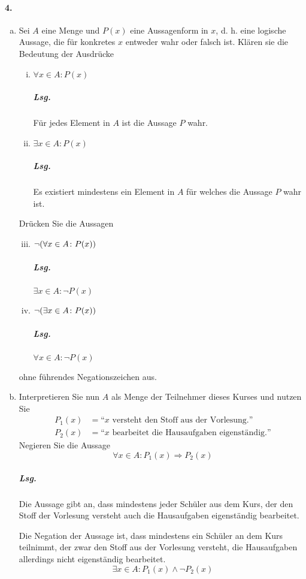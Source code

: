 \documentclass{scrreprt}
\begin{document}
\paragraph{4.}
\begin{enumerate}[a)]
\item Sei $A$ eine Menge und $P(x)$ eine Aussagenform in $x$, d. h. eine
  logische Aussage, die für konkretes $x$ entweder wahr oder falsch ist.
  Klären sie die Bedeutung der Ausdrücke
  \begin{enumerate}[(i)]
  \item $\forall x \in A \colon P(x)$

    \subparagraph{Lsg.} Für jedes Element in $A$ ist die Aussage $P$ wahr.

  \item $\exists x \in A \colon P(x)$

    \subparagraph{Lsg.} Es existiert mindestens ein Element in $A$ für welches
    die Aussage $P$ wahr ist.
  \end{enumerate}
  Drücken Sie die Aussagen
  \begin{enumerate}[(i)]
  \setcounter{enumii}{2}
  \item $\neg \qty(\forall x \in A \colon P(x))$

    \subparagraph{Lsg.} $\exists x \in A \colon \neg P(x)$

  \item $\neg \qty(\exists x \in A \colon P(x))$

    \subparagraph{Lsg.} $\forall x \in A \colon \neg P(x)$
  \end{enumerate}
  ohne führendes Negationszeichen aus.

\newpage
\item Interpretieren Sie nun $A$ als Menge der Teilnehmer dieses Kurses und
  nutzen Sie
  \begin{align*}
    P_1(x) &= \text{``$x$ versteht den Stoff aus der Vorlesung.''} \\
    P_2(x) &= \text{``$x$ bearbeitet die Hausaufgaben eigenständig.''}
  \end{align*}
  Negieren Sie die Aussage
  \[
    \forall x \in A \colon P_1(x) \Rightarrow P_2(x)
  \]

  \subparagraph{Lsg.} Die Aussage gibt an, dass mindestens jeder Schüler aus dem
  Kurs, der den Stoff der Vorlesung versteht auch die Hausaufgaben eigenständig
  bearbeitet.

  Die Negation der Aussage ist, dass mindestens ein Schüler an dem Kurs
  teilnimmt, der zwar den Stoff aus der Vorlesung versteht, die Hausaufgaben
  allerdings nicht eigenständig bearbeitet.
  \[
    \exists x \in A \colon P_1(x) \land \neg P_2(x)
  \]
\end{enumerate}
\end{document}
